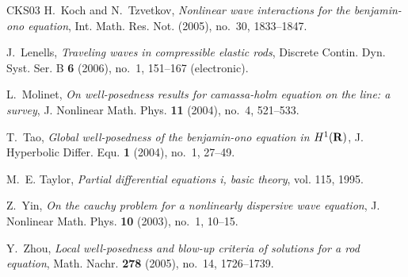 \documentclass[12pt,reqno]{amsart}
\numberwithin{equation}{section}  %
\numberwithin{figure}{section}
\begin{document}
\begin{thebibliography}{CKS{\etalchar{+}}03}
H.~Koch and N.~Tzvetkov, \emph{Nonlinear wave interactions for the benjamin-ono
  equation}, Int. Math. Res. Not. (2005), no.~30, 1833--1847.

J.~Lenells, \emph{Traveling waves in compressible elastic rods}, Discrete
  Contin. Dyn. Syst. Ser. B \textbf{6} (2006), no.~1, 151--167 (electronic).

L.~Molinet, \emph{On well-posedness results for camassa-holm equation on the
  line: a survey}, J. Nonlinear Math. Phys. \textbf{11} (2004), no.~4,
  521--533.

T.~Tao, \emph{Global well-posedness of the benjamin-ono equation in $H^1(\bf
  R)$}, J. Hyperbolic Differ. Equ. \textbf{1} (2004), no.~1, 27--49.

M.~E. Taylor, \emph{Partial differential equations i, basic theory}, vol. 115,
  1995.

Z.~Yin, \emph{On the cauchy problem for a nonlinearly dispersive wave
  equation}, J. Nonlinear Math. Phys. \textbf{10} (2003), no.~1, 10--15.

Y.~Zhou, \emph{Local well-posedness and blow-up criteria of solutions for a rod
  equation}, Math. Nachr. \textbf{278} (2005), no.~14, 1726--1739.

\end{thebibliography}
%
%
%
%
\end{document}
